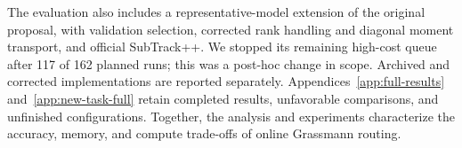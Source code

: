 The evaluation also includes a representative-model extension of the original proposal, with validation selection, corrected rank handling and diagonal moment transport, and official SubTrack++. We stopped its remaining high-cost queue after 117 of 162 planned runs; this was a post-hoc change in scope. Archived and corrected implementations are reported separately. Appendices~\ref{app:full-results} and~\ref{app:new-task-full} retain completed results, unfavorable comparisons, and unfinished configurations. Together, the analysis and experiments characterize the accuracy, memory, and compute trade-offs of online Grassmann routing.
